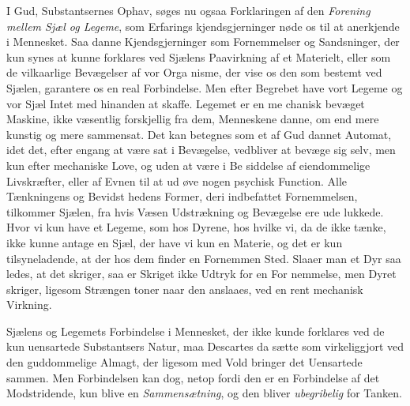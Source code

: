 \documentclass[12pt,a4paper]{book}
\begin{document}
I Gud, Substantsernes Ophav, søges nu ogsaa Forklaringen
af den \emph{Forening mellem Sjæl og Legeme}, som Erfarings\-%
kjendsgjerninger nøde os til at anerkjende i Mennesket. Saa\-%
danne Kjendsgjerninger som Fornemmelser og Sandsninger, der
kun synes at kunne forklares ved Sjælens Paavirkning af et
Materielt, eller som de vilkaarlige Bevægelser af vor Orga\-%
nisme, der vise os den som bestemt ved Sjælen, garantere os
en real Forbindelse. Men efter Begrebet have vort Legeme og
vor Sjæl Intet med hinanden at skaffe. Legemet er en me\-%
chanisk bevæget Maskine, ikke væsentlig forskjellig fra dem,
Menneskene danne, om end mere kunstig og mere sammensat.
Det kan betegnes som et af Gud dannet Automat, idet det,
efter engang at være sat i Bevægelse, vedbliver at bevæge sig
selv, men kun efter mechaniske Love, og uden at være i Be\-%
siddelse af eiendommelige Livskræfter, eller af Evnen til at ud\-%
øve nogen psychisk Function. Alle Tænkningens og Bevidst\-%
hedens Former, deri indbefattet Fornemmelsen, tilkommer
Sjælen, fra hvis Væsen Udstrækning og Bevægelse ere ude\-%
lukkede. Hvor vi kun have et Legeme, som hos Dyrene, hos
hvilke vi, da de ikke tænke, ikke kunne antage en Sjæl, der
have vi kun en Materie, og det er kun tilsyneladende, at der
hos dem finder en Fornemmen Sted. Slaaer man et Dyr saa\-%
ledes, at det skriger, saa er Skriget ikke Udtryk for en For\-%
nemmelse, men Dyret skriger, ligesom Strængen toner naar
den anslaaes, ved en rent mechanisk Virkning.

Sjælens og Legemets Forbindelse i Mennesket, der ikke
kunde forklares ved de kun uensartede Substantsers Natur, maa
Descartes da sætte som virkeliggjort ved den guddommelige
Almagt, der ligesom med Vold bringer det Uensartede sammen.
Men Forbindelsen kan dog, netop fordi den er en Forbindelse
af det Modstridende, kun blive en \emph{Sammensætning}, og
den bliver \emph{ubegribelig} for Tanken.
\end{document}
